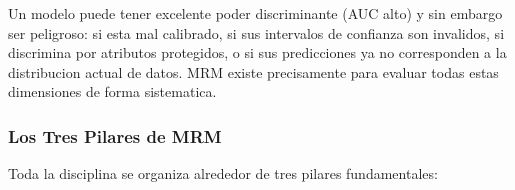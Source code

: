 \documentclass[
  spanish,
  11pt,
  letterpaper,
]{scrbook}
\theoremstyle{plain}
\theoremstyle{remark}
\begin{document}
\begin{tcolorbox}[enhanced jigsaw, arc=.35mm, bottomrule=.15mm, bottomtitle=1mm, breakable, colback=white, colbacktitle=quarto-callout-note-color!10!white, colframe=quarto-callout-note-color-frame, coltitle=black, left=2mm, leftrule=.75mm, opacityback=0, opacitybacktitle=0.6, rightrule=.15mm, title=\textcolor{quarto-callout-note-color}{\faInfo}\hspace{0.5em}{Por que no basta con ``el modelo tiene buen AUC''}, titlerule=0mm, toprule=.15mm, toptitle=1mm]

Un modelo puede tener excelente poder discriminante (AUC alto) y sin
embargo ser peligroso: si esta mal calibrado, si sus intervalos de
confianza son invalidos, si discrimina por atributos protegidos, o si
sus predicciones ya no corresponden a la distribucion actual de datos.
MRM existe precisamente para evaluar todas estas dimensiones de forma
sistematica.

\end{tcolorbox}

\subsubsection{Los Tres Pilares de MRM}\label{los-tres-pilares-de-mrm}

Toda la disciplina se organiza alrededor de tres pilares fundamentales:
\end{document}

